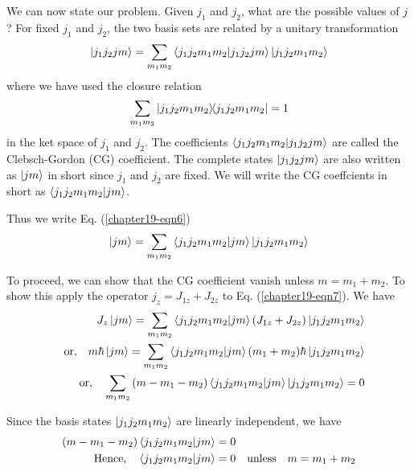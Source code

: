 
We can now state our problem. Given $j_1$ and $j_2$, what are the possible values of $j$? For fixed $j_1$ and $j_2$, the two basis sets are related by a unitary transformation
\begin{equation}
\label{chapter19-eqn6}
\ket{j_1 j_2 j m} = \sum_{m_1 m_2} \braket{j_1 j_2 m_1 m_2}{j_1 j_2 j m}  \ket{j_1 j_2 m_1 m_2}
\end{equation}
where we have used the closure relation
\begin{equation}
\sum_{m_1 m_2} \ketbra{j_1 j_2 m_1 m_2}{j_1 j_2 m_1 m_2}  = 1
\end{equation}
in the ket space of $j_1$ and $j_2$. The coefficients $\braket{j_1 j_2 m_1 m_2}{j_1 j_2 j m}$ are called the Clebsch-Gordon (CG) coefficient. The complete states $\ket{j_1 j_2 j m}$ are also written as $\ket{j m}$ in short since $j_1$ and $j_2$ are fixed.
 We will write the CG coeffcients in short as $\braket{j_1 j_2 m_1 m_2}{j m}$.
 
 Thus we write Eq. (\ref{chapter19-eqn6})
 \begin{equation}
 \label{chapter19-eqn7}
 \ket{j m} = \sum_{m_1 m_2} \braket{j_1 j_2 m_1 m_2}{j m}  \ket{j_1 j_2 m_1 m_2}
 \end{equation}
 
 To proceed, we can show that the CG coefficient vanish unless $m=m_1 + m_2$. To show this apply the operator $j_z = J_{1 z} + J_{2 z}$ to Eq. (\ref{chapter19-eqn7}). We have
 \begin{align*}
 J_z \ket{j m} = \sum_{m_1 m_2} \braket{j_1 j_2 m_1 m_2}{j m}  \qty(J_{1 z} + J_{2 z}) \ket{j_1 j_2 m_1 m_2} \\
\qq{or,} m\hbar \ket{j m} = \sum_{m_1 m_2} \braket{j_1 j_2 m_1 m_2}{j m} \qty(m_1 + m_2)\hbar \ket{j_1 j_2 m_1 m_2} \\
\qq{or,} \sum_{m_1 m_2} \qty(m - m_1 - m_2)   \braket{j_1 j_2 m_1 m_2}{j m}  \ket{j_1 j_2 m_1 m_2} = 0
 \end{align*}
 
 Since the basis states $\ket{j_1 j_2 m_1 m_2}$ are linearly independent, we have
 \begin{align}
 \qty(m - m_1 - m_2)   \braket{j_1 j_2 m_1 m_2}{j m} & = 0 \nonumber\\
  \label{chapter19-eqn8}
 \qq{Hence,} \braket{j_1 j_2 m_1 m_2}{j m} &=0 \qq{unless} m= m_1 + m_2
 \end{align}

